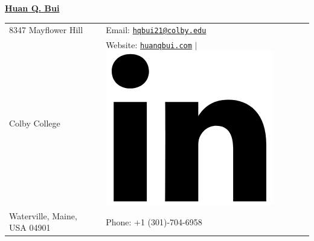 \documentclass[10pt]{article}
\newcommand{\longunderline}[1]{\uline{#1\hfill\mbox{}}}
\begin{document}
\noindent  \longunderline{\LARGE{\textbf{Huan Q. Bui}}}  \\
\vspace{-2ex}

\normalsize


\begin{center}
\begin{tabular}{l l}
     8347 Mayflower Hill 		 & \hspace{1in} Email: \href{mailto:hqbui21@colby.edu}{\texttt{hqbui21@colby.edu}} \\
     Colby College 				 & \hspace{1in}  Website: \href{www.huanqbui.com}{\texttt{huanqbui.com}} $\vert$ 					\href{https://www.linkedin.com/in/huan-bui/}{\includegraphics[scale=0.04]{linkedin_logo.PNG}}\\
 	Waterville, Maine, USA 04901 & \hspace{1in} Phone: +1 (301)-704-6958\\
\end{tabular}
\end{center}
\end{document}
